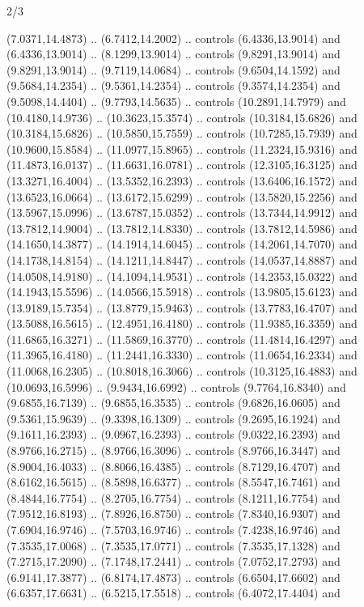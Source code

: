 \begin{flagdescription}{2/3}
\begin{scope}[yshift=\flagwidth,scale=\flagwidth/1241.93737]
\begin{scope}[y=-1mm, x=1mm,draw=gold,fill=blue,line join=miter,miter limit=4,line width=1.8\lw]
{  (7.0371,14.4873) .. (6.7412,14.2002) .. controls (6.4336,13.9014) and
  (6.4336,13.9014) .. (8.1299,13.9014) .. controls (9.8291,13.9014) and
  (9.8291,13.9014) .. (9.7119,14.0684) .. controls (9.6504,14.1592) and
  (9.5684,14.2354) .. (9.5361,14.2354) .. controls (9.3574,14.2354) and
  (9.5098,14.4404) .. (9.7793,14.5635) .. controls (10.2891,14.7979) and
  (10.4180,14.9736) .. (10.3623,15.3574) .. controls (10.3184,15.6826) and
  (10.3184,15.6826) .. (10.5850,15.7559) .. controls (10.7285,15.7939) and
  (10.9600,15.8584) .. (11.0977,15.8965) .. controls (11.2324,15.9316) and
  (11.4873,16.0137) .. (11.6631,16.0781) .. controls (12.3105,16.3125) and
  (13.3271,16.4004) .. (13.5352,16.2393) .. controls (13.6406,16.1572) and
  (13.6523,16.0664) .. (13.6172,15.6299) .. controls (13.5820,15.2256) and
  (13.5967,15.0996) .. (13.6787,15.0352) .. controls (13.7344,14.9912) and
  (13.7812,14.9004) .. (13.7812,14.8330) .. controls (13.7812,14.5986) and
  (14.1650,14.3877) .. (14.1914,14.6045) .. controls (14.2061,14.7070) and
  (14.1738,14.8154) .. (14.1211,14.8447) .. controls (14.0537,14.8887) and
  (14.0508,14.9180) .. (14.1094,14.9531) .. controls (14.2353,15.0322) and
  (14.1943,15.5596) .. (14.0566,15.5918) .. controls (13.9805,15.6123) and
  (13.9189,15.7354) .. (13.8779,15.9463) .. controls (13.7783,16.4707) and
  (13.5088,16.5615) .. (12.4951,16.4180) .. controls (11.9385,16.3359) and
  (11.6865,16.3271) .. (11.5869,16.3770) .. controls (11.4814,16.4297) and
  (11.3965,16.4180) .. (11.2441,16.3330) .. controls (11.0654,16.2334) and
  (11.0068,16.2305) .. (10.8018,16.3066) .. controls (10.3125,16.4883) and
  (10.0693,16.5996) .. (9.9434,16.6992) .. controls (9.7764,16.8340) and
  (9.6855,16.7139) .. (9.6855,16.3535) .. controls (9.6826,16.0605) and
  (9.5361,15.9639) .. (9.3398,16.1309) .. controls (9.2695,16.1924) and
  (9.1611,16.2393) .. (9.0967,16.2393) .. controls (9.0322,16.2393) and
  (8.9766,16.2715) .. (8.9766,16.3096) .. controls (8.9766,16.3447) and
  (8.9004,16.4033) .. (8.8066,16.4385) .. controls (8.7129,16.4707) and
  (8.6162,16.5615) .. (8.5898,16.6377) .. controls (8.5547,16.7461) and
  (8.4844,16.7754) .. (8.2705,16.7754) .. controls (8.1211,16.7754) and
  (7.9512,16.8193) .. (7.8926,16.8750) .. controls (7.8340,16.9307) and
  (7.6904,16.9746) .. (7.5703,16.9746) .. controls (7.4238,16.9746) and
  (7.3535,17.0068) .. (7.3535,17.0771) .. controls (7.3535,17.1328) and
  (7.2715,17.2090) .. (7.1748,17.2441) .. controls (7.0752,17.2793) and
  (6.9141,17.3877) .. (6.8174,17.4873) .. controls (6.6504,17.6602) and
  (6.6357,17.6631) .. (6.5215,17.5518) .. controls (6.4072,17.4404) and
}
\end{scope}
\end{scope}
\end{flagdescription}
